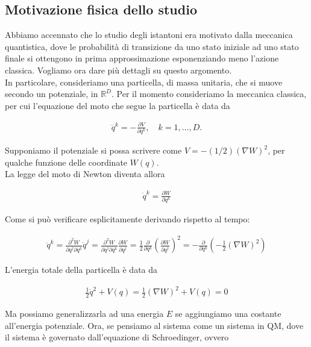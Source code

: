 \documentclass{report}
\begin{document}
\subsection{Motivazione fisica dello studio}


Abbiamo accennato che lo studio degli istantoni era motivato dalla meccanica quantistica, dove le probabilità di transizione da uno stato iniziale ad uno stato finale si ottengono in prima approssimazione esponenziando meno l'azione classica. Vogliamo ora dare più dettagli su questo argomento. \\

In particolare, consideriamo una particella, di massa unitaria, che si muove secondo un potenziale, in \(\mathbb{R}^D\). Per il momento consideriamo la meccanica classica, per cui l'equazione del moto che segue la particella è data da 

\begin{align}
    \ddot{q}^k = -\frac{\partial V}{\partial q^k}, \quad k=1, \ldots, D. 
\end{align}

Supponiamo il potenziale si possa scrivere come \(V = -(1/2)(\nabla W)^2\), per qualche funzione delle coordinate \(W(q)\). \\

La legge del moto di Newton diventa allora 

\begin{align}
    \dot{q}^k = \frac{\partial W}{\partial q^k}
\end{align}

Come si può verificare esplicitamente derivando rispetto al tempo: 

\begin{align}
    \ddot{q}^k = \frac{\partial^2 W}{\partial q^j \partial q^k}\dot{q}^j = \frac{\partial^2 W}{\partial q^j \partial q^k}\frac{\partial W}{\partial q^j} = \frac{1}{2}\frac{\partial }{\partial q^k}\left(\frac{\partial W}{\partial q^j} \right)^2 = - \frac{\partial}{\partial q^k}\left(-\frac{1}{2}(\nabla W)^2 \right)
\end{align}


L'energia totale della particella è data da 

\begin{align}
    \frac{1}{2}\dot{q}^2 + V(q) = \frac{1}{2}(\nabla W)^2 + V(q) = 0 
\end{align}

Ma possiamo generalizzarla ad una energia \(E\) se aggiungiamo una costante all'energia potenziale. Ora, se pensiamo al sistema come un sistema in QM, dove il sistema è governato dall'equazione di Schroedinger, ovvero 
\end{document}
